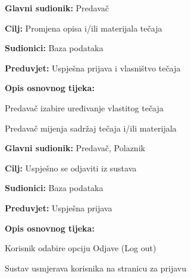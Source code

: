 			\begin{packed_item}
				
				\item \textbf{Glavni sudionik:} Predavač
				\item  \textbf{Cilj:} Promjena opisa i/ili materijala tečaja
				\item  \textbf{Sudionici:} Baza podataka
				\item  \textbf{Preduvjet:} Uspješna prijava i vlasništvo tečaja
 				\item  \textbf{Opis osnovnog tijeka:}
				
				\item[] \begin{packed_enum}
					
					\item Predavač izabire uređivanje vlastitog tečaja
					\item Predavač mijenja sadržaj tečaja i/ili materijala
					
				\end{packed_enum}
				
			\end{packed_item}
			\noindent \underbar{\textbf{UC11 - Odjava}}
			\begin{packed_item}
				
				\item \textbf{Glavni sudionik:} Predavač, Polaznik
				\item  \textbf{Cilj:} Uspješno se odjaviti iz sustava
				\item  \textbf{Sudionici:} Baza podataka
				\item  \textbf{Preduvjet:} Uspješna prijava
				\item  \textbf{Opis osnovnog tijeka:}
				
				\item[] \begin{packed_enum}
					
					\item Korisnik odabire opciju Odjave (Log out)
					\item Sustav usmjerava korisnika na stranicu za prijavu
					
				\end{packed_enum}
				
				
			\end{packed_item}	
			\noindent {}
